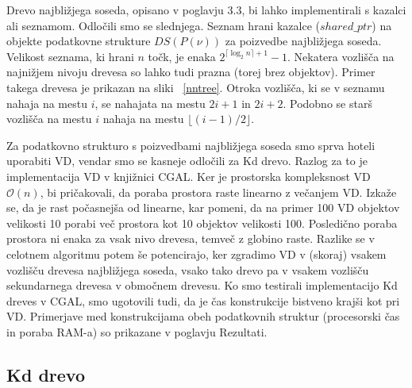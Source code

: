 \documentclass[a4paper, 12pt]{book}
\newcommand{\OO}{\ensuremath{\mathcal{O}}} %
\begin{document}
Drevo najbližjega soseda, opisano v poglavju 3.3, bi lahko implementirali s kazalci ali seznamom. Odločili smo se slednjega. Seznam hrani kazalce ($shared{\_}ptr$) na objekte podatkovne strukture $DS(P(\nu))$ za poizvedbe najbližjega soseda. Velikost seznama, ki hrani $n$ točk, je enaka $2^{\lceil \log_2n \rceil+1}-1$. Nekatera vozlišča na najnižjem nivoju drevesa so lahko tudi prazna (torej brez objektov). Primer takega drevesa je prikazan na sliki ~\ref{nntree}. Otroka vozlišča, ki se v seznamu nahaja na mestu $i$, se nahajata na mestu $2i+1$ in $2i+2$. Podobno se starš vozlišča na mestu $i$ nahaja na mestu $\lfloor(i-1)/2\rfloor$.


Za podatkovno strukturo s poizvedbami najbližjega soseda smo sprva hoteli uporabiti VD, vendar smo se kasneje odločili za Kd drevo. Razlog za to je implementacija VD v knjižnici CGAL. Ker je prostorska kompleksnost VD $\OO(n)$, bi pričakovali, da poraba prostora raste linearno z večanjem VD. Izkaže se, da je rast počasnejša od linearne, kar pomeni, da na primer 100 VD objektov velikosti 10 porabi več prostora kot 10 objektov velikosti 100. Posledično poraba prostora ni enaka za vsak nivo drevesa, temveč z globino raste. Razlike se v celotnem algoritmu potem še potencirajo, ker zgradimo VD v (skoraj) vsakem vozlišču drevesa najbližjega soseda, vsako tako drevo pa v vsakem vozlišču sekundarnega drevesa v območnem drevesu. Ko smo testirali implementacijo Kd dreves v CGAL, smo ugotovili tudi, da je čas konstrukcije bistveno krajši kot pri VD. Primerjave med konstrukcijama obeh podatkovnih struktur (procesorski čas in poraba RAM-a) so prikazane v poglavju Rezultati.

\subsection{Kd drevo}
\end{document}
